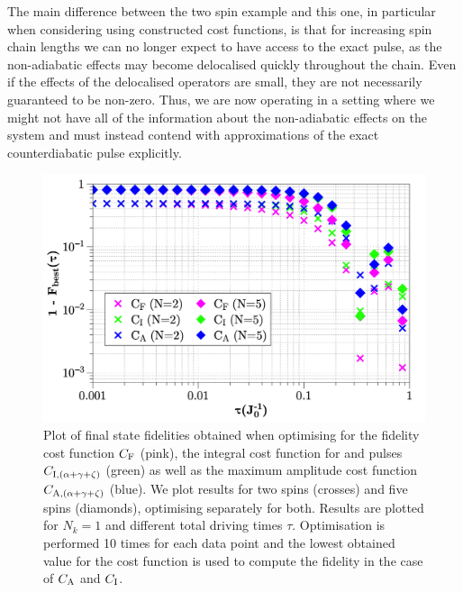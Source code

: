 The main difference between the two spin example and this one, in particular when considering using  constructed cost functions, is that for increasing spin chain lengths we can no longer expect to have access to the exact  pulse, as the non-adiabatic effects may become delocalised quickly throughout the chain. Even if the effects of the delocalised  operators are small, they are not necessarily guaranteed to be non-zero. Thus, we are now operating in a setting where we might not have all of the information about the non-adiabatic effects on the system and must instead contend with  approximations of the exact counterdiabatic pulse explicitly.
\begin{figure}[t]
    \centering
    \includegraphics[width=0.8\linewidth]{images/No_cd_higher_order.png} \caption[Plot of final state fidelity for the Ising spin chain for different cost functions and no counterdiabatic component in the implementation.]{Plot of final state fidelities obtained when optimising for the fidelity cost function $C_{\rm F}$ (pink), the integral cost function for  and   pulses $C_{\rm I, (\alpha + \gamma + \zeta)}$ (green) as well as the maximum amplitude cost function $C_{\rm A, (\alpha + \gamma + \zeta)}$ (blue). We plot results for two spins (crosses) and five spins (diamonds), optimising separately for both. Results are plotted for $N_k = 1$ and different total driving times $\tau$. Optimisation is performed 10 times for each data point and the lowest obtained value for the cost function is used to compute the fidelity in the case of $C_{\rm A}$ and $C_{\rm I}$.}\label{fig:ising_nocd_higher_order}
\end{figure}


